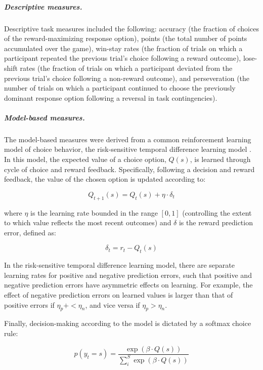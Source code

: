 \documentclass[a4paper,notitlepage,12pt]{article}
\begin{document}
\begin{refsection}[main]
\subparagraph{Descriptive measures.} Descriptive task measures included the following: accuracy (the fraction of choices of the reward-maximizing response option), points (the total number of points accumulated over the game), win-stay rates (the fraction of trials on which a participant repeated the previous trial's choice following a reward outcome), lose-shift rates (the fraction of trials on which a participant deviated from the previous trial's choice following a non-reward outcome), and perseveration (the number of trials on which a participant continued to choose the previously dominant response option following a reversal in task contingencies).

\subparagraph{Model-based measures.} The model-based measures were derived from a common reinforcement learning model of choice behavior, the risk-sensitive temporal difference learning model \cite{niv2012neural}. In this model, the expected value of a choice option, $Q(s)$, is learned through cycle of choice and reward feedback. Specifically, following a decision and reward feedback, the value of the chosen option is updated according to:

\begin{equation*}
    Q_{t+1}(s) = Q_{t}(s) + \eta \cdot \delta_{t}
\end{equation*}

where $\eta$ is the learning rate bounded in the range $[0,1]$ (controlling the extent to which value reflects the most recent outcomes) and $\delta$ is the reward prediction error, defined as:

\begin{equation*}
    \delta_t = r_t - Q_{t}(s)
\end{equation*}

In the risk-sensitive temporal difference learning model, there are separate learning rates for positive and negative prediction errors, such that positive and negative prediction errors have asymmetric effects on learning. For example, the effect of negative prediction errors on learned values is larger than that of positive errors if $\eta_p+ < \eta_n$, and vice versa if $\eta_p > \eta_n$.

Finally, decision-making according to the model is dictated by a softmax choice rule:

\begin{equation*}
    p(y_t = s) = \frac{\exp \left( \beta \cdot Q(s) \right)}{\sum_i^S \exp \left( \beta \cdot Q(s) \right)}
\end{equation*}


\end{refsection}
\end{document}
